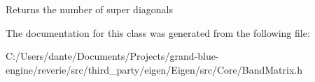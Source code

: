 \begin{DoxyReturn}{Returns}
the number of super diagonals 
\end{DoxyReturn}


The documentation for this class was generated from the following file\+:\begin{DoxyCompactItemize}
\item 
C\+:/\+Users/dante/\+Documents/\+Projects/grand-\/blue-\/engine/reverie/src/third\+\_\+party/eigen/\+Eigen/src/\+Core/Band\+Matrix.\+h\end{DoxyCompactItemize}
